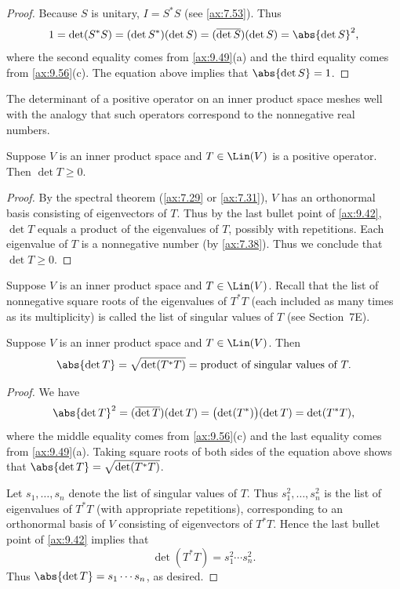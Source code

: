 \begin{proof}
Because $S$ is unitary, $I=S^*S$ (see \ref{ax:7.53}). Thus
\[ 1 = \det(S^*S) = (\det S^*)(\det S) = (\overline{\det S})(\det S)
   = \abs{\det S}^2, \]
where the second equality comes from \ref{ax:9.49}(a) and the third equality
comes from \ref{ax:9.56}(c). The equation above implies that
$\abs{\det S}=1$.
\end{proof}

The determinant of a positive operator on an inner product space meshes well
with the analogy that such operators correspond to the nonnegative real
numbers.

\begin{result}\label{ax:9.59}
Suppose $V$ is an inner product space and $T\in\Lin(V)$ is a positive
operator. Then $\det T\ge0$.
\end{result}

\begin{proof}
By the spectral theorem (\ref{ax:7.29} or \ref{ax:7.31}), $V$ has an
orthonormal basis consisting of eigenvectors of $T$. Thus by the last bullet
point of \ref{ax:9.42}, $\det T$ equals a product of the eigenvalues of $T$,
possibly with repetitions. Each eigenvalue of $T$ is a nonnegative number (by
\ref{ax:7.38}). Thus we conclude that $\det T\ge0$.
\end{proof}

Suppose $V$ is an inner product space and $T\in\Lin(V)$. Recall that the list
of nonnegative square roots of the eigenvalues of $T^*T$ (each included as many
times as its multiplicity) is called the list of singular values of $T$ (see
Section~7E).

\begin{result}[$\abs{\det T}={}$product of singular values of $T$]\label{ax:9.60}
Suppose $V$ is an inner product space and $T\in\Lin(V)$. Then
\[ \abs{\det T} = \sqrt{\det(T^*T)}
   = \text{product of singular values of } T. \]
\end{result}

\begin{proof}
We have
\[ \abs{\det T}^2 = (\overline{\det T})(\det T)
   = \bigl(\det(T^*)\bigr)(\det T) = \det(T^*T), \]
where the middle equality comes from \ref{ax:9.56}(c) and the last equality
comes from \ref{ax:9.49}(a). Taking square roots of both sides of the equation
above shows that $\abs{\det T}=\sqrt{\det(T^*T)}$.

Let $s_1,\dots,s_n$ denote the list of singular values of $T$. Thus
$s_1^2,\dots,s_n^2$ is the list of eigenvalues of $T^*T$ (with appropriate
repetitions), corresponding to an orthonormal basis of $V$ consisting of
eigenvectors of $T^*T$. Hence the last bullet point of \ref{ax:9.42} implies
that
\[ \det(T^*T) = s_1^2\cdots s_n^2. \]
Thus $\abs{\det T}=s_1\cdots s_n$, as desired.
\end{proof}

